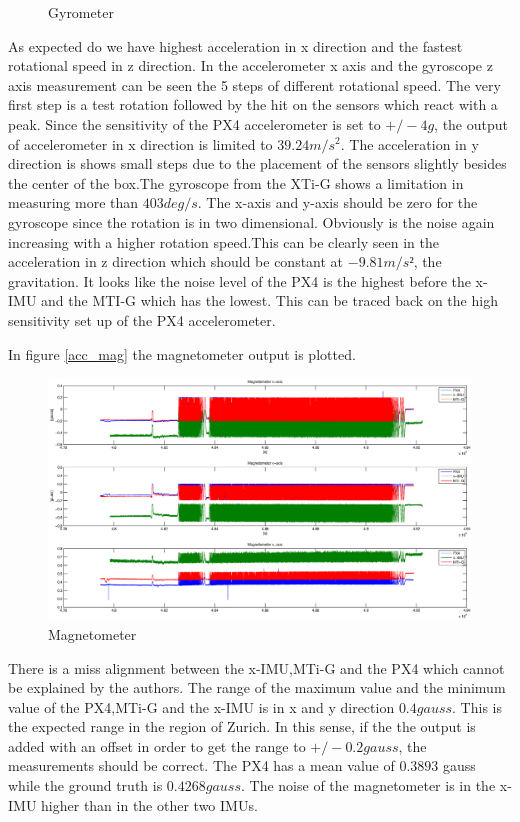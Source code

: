 \begin{description}
\begin{figure}[h]
\caption{Gyrometer}
\label{ct_gyro}
\end{figure}
As expected do we have highest acceleration in x direction and the fastest rotational speed in z direction. In the accelerometer x axis and the gyroscope z axis measurement can be seen the 5 steps of different rotational speed. The very first step is a test rotation followed by the hit on the sensors which react with a peak. Since the sensitivity of the PX4 accelerometer is set to $+/- 4 g$, the output of accelerometer in x direction is limited to $39.24 m/s^2$. The acceleration in y direction is shows small steps due to the placement of the sensors slightly besides the center of the box.The gyroscope from the XTi-G shows a limitation in measuring more than $ 403 deg/s$. The x-axis and y-axis should be zero for the gyroscope since the rotation is in two dimensional. Obviously  is the noise again increasing with a higher rotation speed.This can be clearly seen in the acceleration in z direction which should be constant at $-9.81 m/s²$, the gravitation. It looks like the noise level of the PX4 is the highest before the x-IMU and the MTI-G which has the lowest. This can be traced back on the high sensitivity set up of the PX4 accelerometer.


In figure \ref{acc_mag} the magnetometer output is plotted.
\begin{figure}[h]
\includegraphics[width=1.2\textwidth]{pictures/ct_mag.eps}
\caption{Magnetometer}
\label{ct_mag}
\end{figure}
 There is a miss alignment between the x-IMU,MTi-G and the PX4 which cannot be explained by the authors. The range of the maximum value and the minimum value of the PX4,MTi-G and the x-IMU is in x and y direction $0.4 gauss$. This is the expected range in the region of Zurich. In this sense, if the the output is added with an offset in order to get the range to $+/- 0.2 gauss$, the measurements should be correct. The PX4 has a mean value of $0.3893$ gauss while the ground truth is $0.4268 gauss$.  The noise of the magnetometer is in the x-IMU higher than in the other two IMUs.


\end{description}
